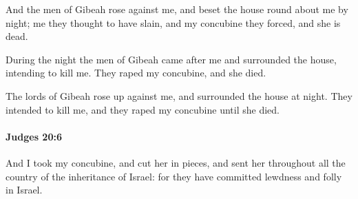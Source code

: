 			\begin{versebox}
					\item[BHS] 
					\item[ASV] And the men of Gibeah rose against me, and beset the house round about me by night; me they thought to have slain, and my concubine they forced, and she is dead.
					\item[NIV] During the night the men of Gibeah came after me and surrounded the house, intending to kill me. They raped my concubine, and she died.
					\item[NRSV] The lords of Gibeah rose up against me, and surrounded the house at night. They intended to kill me, and they raped my concubine until she died.
			\end{versebox}

		\paragraph{Judges 20:6} %
			\label{JUDGES-20-6}

			And I took my concubine, and cut her in pieces, and sent her throughout all the country of the inheritance of Israel: for they have committed lewdness and folly in Israel.

